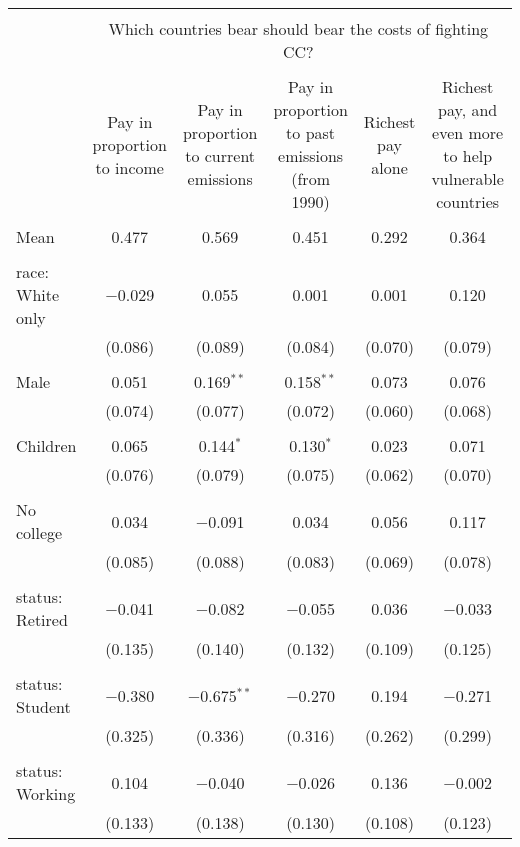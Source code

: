 
\begin{tabular}{@{\extracolsep{5pt}}lccccc} 
\\[-1.8ex]\hline 
\hline \\[-1.8ex] 
 & \multicolumn{5}{c}{Which countries bear should bear the costs of fighting CC?} \\ 
\cline{2-6} 
\\[-1.8ex] & Pay in proportion to income & Pay in proportion to current emissions & Pay in proportion to past emissions (from 1990) & Richest pay alone & Richest pay, and even more to help vulnerable countries \\ 
\hline \\[-1.8ex] 
 Mean & 0.477 & 0.569 & 0.451 & 0.292 & 0.364  \\ \hline \\[-1.8ex] race: White only & $-$0.029 & 0.055 & 0.001 & 0.001 & 0.120 \\ 
  & (0.086) & (0.089) & (0.084) & (0.070) & (0.079) \\ 
  & & & & & \\ 
 Male & 0.051 & 0.169$^{**}$ & 0.158$^{**}$ & 0.073 & 0.076 \\ 
  & (0.074) & (0.077) & (0.072) & (0.060) & (0.068) \\ 
  & & & & & \\ 
 Children & 0.065 & 0.144$^{*}$ & 0.130$^{*}$ & 0.023 & 0.071 \\ 
  & (0.076) & (0.079) & (0.075) & (0.062) & (0.070) \\ 
  & & & & & \\ 
 No college & 0.034 & $-$0.091 & 0.034 & 0.056 & 0.117 \\ 
  & (0.085) & (0.088) & (0.083) & (0.069) & (0.078) \\ 
  & & & & & \\ 
 status: Retired & $-$0.041 & $-$0.082 & $-$0.055 & 0.036 & $-$0.033 \\ 
  & (0.135) & (0.140) & (0.132) & (0.109) & (0.125) \\ 
  & & & & & \\ 
 status: Student & $-$0.380 & $-$0.675$^{**}$ & $-$0.270 & 0.194 & $-$0.271 \\ 
  & (0.325) & (0.336) & (0.316) & (0.262) & (0.299) \\ 
  & & & & & \\ 
 status: Working & 0.104 & $-$0.040 & $-$0.026 & 0.136 & $-$0.002 \\ 
  & (0.133) & (0.138) & (0.130) & (0.108) & (0.123) \\ 

\end{tabular}
